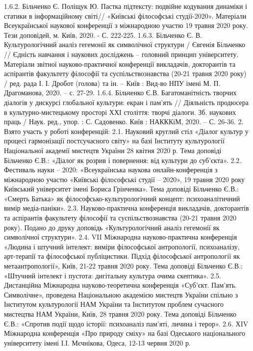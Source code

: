 1.6.2. Більченко Є. Поліщук Ю. Пастка підтексту: подвійне кодування динаміки і статики в інформаційному світі// «Київські філософські студії-2020». Матеріали Всеукраїнської наукової конференції з міжнародною участю 19 травня 2020 року. Тези доповідей, м. Київ, 2020. - С. 222-225.
1.6.3. Більченко Є. В.  Культурологічний аналіз гегемонії як символічної структури / Євгенія Більченко // Єдність навчання і наукових досліджень – головний принцип університету. Матеріали звітної науково-практичної конференції викладачів, докторантів та аспірантів факультету філософії та суспільствознавства (20-21 травня 2020 року) / ред. рада І. І. Дробот (голова) та ін. – Київ : Вид-во НПУ імені М. П. Драгоманова, 2020. – с. 27-29. 
1.6.4. Більченко Є.В. Багатоманітність творчих діалогів у дискурсі глобальної культури: екран і пам’ять // Діяльність продюсера в культурно-мистецькому просторі ХХІ століття: творчі діалоги. Зб. наукових праць / Наук. ред., упор. : С. Садовенко. Київ : НАКККіМ, 2020. – С. 26-36. 
2. Взято участь у роботі конференцій: 
2.1. Науковий круглий стіл «Діалог культур у процесі гармонізації постсучасного світу» на базі Інституту культурології Національної академії мистецтв України 28 квітня 2020 р. Тема доповіді Більченко Є.В.: «Діалог як розрив і повернення: від культури до суб’єкта». 
2.2. Фестиваль науки – 2020: «Всеукраїнська наукова онлайн-конференція з міжнародною участю «Київські філософські студії – 2020», 19 травня 2020 року Київський університет імені Бориса Грінченка». Тема доповіді Більченко Є.В.: «Смерть Батька» як філософсько-культурологічний концепт: психоаналітичний вимір медіа-паніки». 
2.3. Науково-практична конференція викладачів, докторантів та аспірантів факультету філософії та суспільствознавства (20-21 травня 2020 року). Подано до друку доповідь «Культурологічний аналіз гегемонії як символічної структури».
2.4. VII Міжнародна науково-практична конференція «Людина і штучний інтелект: виміри філософської антропології, психоаналізу, арт-терапії  та філософської публіцистики. Підхід філософської антропології як метаантропології», Київ, 21-22 травня 2020 року. Тема доповіді Більченко Є.В.: «Штучний інтелект і пустота: дигітальну культура очима скептика». 
2.5. Дистанційна Міжнародна науково-теоретична конференція «Суб’єкт. Пам’ять. Символічне», проведена Національною академією мистецтв України спільно з Інститутом культурології НАМ України та Інститутом проблем сучасного мистецтва НАМ України, Київ, 28 травня 2020 року. Тема доповіді Більченко Є.В.: «Спротив події щодо історії: психоаналіз пам’яті, личина і терор». 
2.6. ХIV Міжнародна конференція «Про природу сміху» на базі Одеського національного університету імені І.І. Мєчнікова, Одеса, 12-13 червня 2020 р. 
